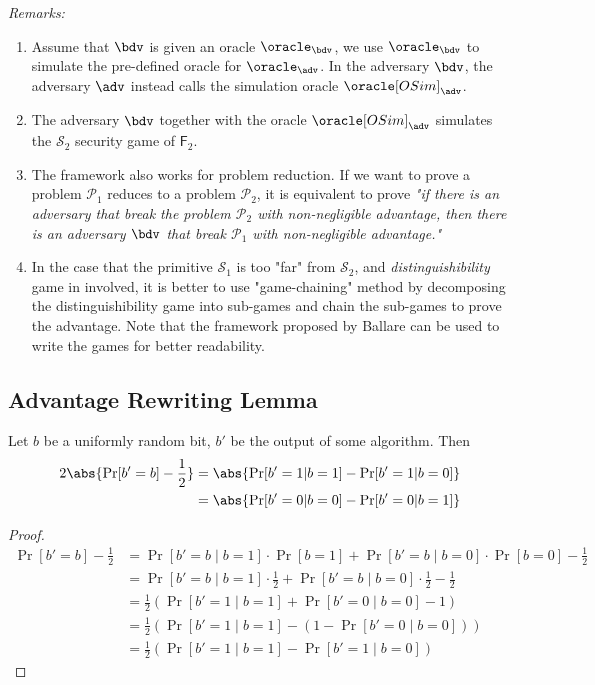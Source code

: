 \documentclass[11pt,a4paper]{article}
\begin{document}
\textit{Remarks:}
\begin{enumerate}
	\item Assume that $\bdv$ is given an oracle $\oracle_{\bdv}$, we use $\oracle_{\bdv}$ to simulate the pre-defined oracle for $\oracle_\adv$. In the adversary $\bdv$, the adversary $\adv$ instead calls the simulation oracle $\oracle[OSim]_\adv$. 
	\item The adversary $\bdv$ together with the oracle $\oracle[OSim]_\adv$ simulates the $\mathcal{S}_2$ security game of $\textsf{F}_2$. 
	\item The framework also works for problem reduction. If we want to prove a problem $\mathcal{P}_1$ reduces to a problem $\mathcal{P}_2$, it is equivalent to prove \textit{"if there is an adversary that break the problem $\mathcal{P}_2$ with non-negligible advantage, then there is an adversary $\bdv$ that break $\mathcal{P}_1$ with non-negligible advantage."}
	\item In the case that the primitive $\mathcal{S}_1$ is too "far" from $\mathcal{S}_2$, and \textit{distinguishibility} game in involved, it is better to use "game-chaining" method by decomposing the distinguishibility game into sub-games and chain the sub-games to prove the advantage. Note that the framework proposed by Ballare can be used to write the games for better readability.  
\end{enumerate}



\subsection{Advantage Rewriting Lemma}
Let $b$ be a uniformly random bit, $b'$ be the output of some algorithm. Then 
$$
\begin{aligned}
2 \abs{\Pr[b' = b] - \frac{1}{2}} 
&= \abs{\Pr[b' = 1 | b = 1] - \Pr[b' = 1 | b = 0] } \\
&= \abs{\Pr[b' = 0 | b = 0] - \Pr[b' = 0 | b = 1] }
\end{aligned}
$$

\begin{proof}
$$
\begin{aligned}
\Pr[b'=b] - \frac{1}{2} &= \Pr[b' = b \mid b = 1] \cdot \Pr[b=1] + \Pr[b'=b \mid b = 0] \cdot \Pr[b = 0] - \frac{1}{2} \\	
&=  \Pr[b' = b \mid b = 1] \cdot \frac{1}{2} + \Pr[b' = b \mid b = 0] \cdot \frac{1}{2} - \frac{1}{2} \\  
&= \frac{1}{2}(\Pr[b'=1 \mid b = 1] + \Pr[b' = 0 \mid b=0] - 1) \\
&= \frac{1}{2}(\Pr[b'=1 \mid b = 1] - (1 - \Pr[b' = 0 \mid b = 0])) \\
&= \frac{1}{2}(\Pr[b'=1 \mid b=1] - \Pr[b'=1 \mid b = 0])
\end{aligned}
$$

\end{proof}
\end{document}
